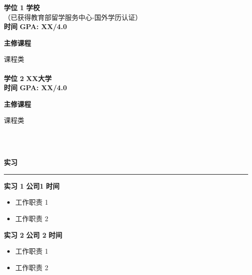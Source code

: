 \documentclass{article}
\theoremstyle{plain}
\begin{document}
\MakeUppercase{\normalsize\textbf{学位 1}}
\hfill
\MakeUppercase{\normalsize\textbf{学校}}
\hfill
\\
{（已获得教育部留学服务中心-国外学历认证）}
\\
\MakeUppercase{\normalsize\textbf{时间}}
\hfill\MakeUppercase{\normalsize\textbf{GPA: xx/4.0}}

\begin{flushleft}
\MakeUppercase{\normalsize\textbf{主修课程}}
\end{flushleft}

{课程类}
\\
\\
\MakeUppercase{\normalsize\textbf{学位 2}}
\hfill
\MakeUppercase{\normalsize\textbf{xx大学}}
\hfill
\\
\MakeUppercase{\normalsize\textbf{时间}}
\hfill\MakeUppercase{\normalsize\textbf{GPA: xx/4.0}}
\begin{flushleft}
\MakeUppercase{\normalsize\textbf{主修课程}}
\end{flushleft}

{课程类}


\\\hspace*{\fill}\\ %
\begin{flushleft}
\MakeUppercase{\LARGE\textbf{实习}} %
\end{flushleft}
\rule[4pt]{18cm}{0.5pt} %

\MakeUppercase{\normalsize\textbf{实习 1}}  %
\hfill
\MakeUppercase{\normalsize\textbf{公司1}}
\hfill
\MakeUppercase{\normalsize\textbf{时间}}
\begin{itemize}
	\item{\normalsize{工作职责 1}}
	\item{\normalsize{工作职责 2}}
\end{itemize}

\MakeUppercase{\normalsize\textbf{实习 2}}  %
\hfill
\MakeUppercase{\normalsize\textbf{公司 2}}
\hfill
\MakeUppercase{\normalsize\textbf{时间}}
\begin{itemize}
	\item{\normalsize{工作职责 1}}
	\item{\normalsize{工作职责 2}}
\end{itemize}


\\\hspace*{\fill}\\
\end{document}
